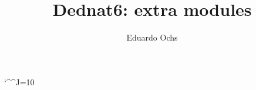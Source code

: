 \documentclass[oneside]{article}
\begin{document}
\catcode`\^^J=10




\def\co#1{{%
  \def\%{\char37}%
  \def\\{\char92}%
  \def\^{\char94}%
  \def\~{\char126}%
  \tt#1%
  }}
\def\qco#1{`\co{#1}'}
\def\qqco#1{``\co{#1}''}

\def\bsk{\bigskip}
\def\msk{\medskip}
\def\ssk{\smallskip}

\def\defzha#1#2{\expandafter\def\csname zha-#1\endcsname{#2}}
\def\ifzhaundefined#1{\expandafter\ifx\csname zha-#1\endcsname\relax}
\def\zha#1{\ifzhaundefined{#1}
    \errmessage{UNDEFINED ZHA: #1}
  \else
    \csname zha-#1\endcsname
  \fi
}
\def\deftcg#1#2{\expandafter\def\csname tcg-#1\endcsname{#2}}
\def\iftcgundefined#1{\expandafter\ifx\csname tcg-#1\endcsname\relax}
\def\tcg#1{\iftcgundefined{#1}
    \errmessage{UNDEFINED TCG: #1}
  \else
    \csname tcg-#1\endcsname
  \fi
}
\def\defub#1#2{\expandafter\def\csname ub-#1\endcsname{#2}}
\def\ifubundefined#1{\expandafter\ifx\csname ub-#1\endcsname\relax}
\def\ub#1{\ifubundefined{#1}
    \errmessage{UNDEFINED UB: #1}
  \else
    \csname ub-#1\endcsname
  \fi
}
\def\und#1#2{\underbrace{#1}_{#2}}

%
\def\squigbij{\newsquigbij}
\def\newsquigbij{\;\; \squigbijbody \;\;}
\def\squigbijy{-1.2}
\def\squigbijbody{\squigbijbodywithparams{1.5pt}{0.3pt}{1.0}}
\def\squigbijtriangle(#1,#2)#3{\polygon*(#1,0)(#2,#3)(#2,-#3)}
\def\squigbijbodywithparams#1#2#3{{%
  \unitlength=#1
  \linethickness{#2}
  \begin{picture}(22.4,2.4)(-5.2,\squigbijy)%
    \polyline(-3,0)(0,0)(1,1)(3,-1)(5,1)(7,-1)(9,1)(11,-1)(12,0)(14,0)
    \squigbijtriangle(-5,-2){#3}
    \squigbijtriangle(17,14){#3}
  \end{picture}%
  }}




%                     
\title{Dednat6: extra modules}

\author{Eduardo Ochs}

\maketitle
\end{document}
